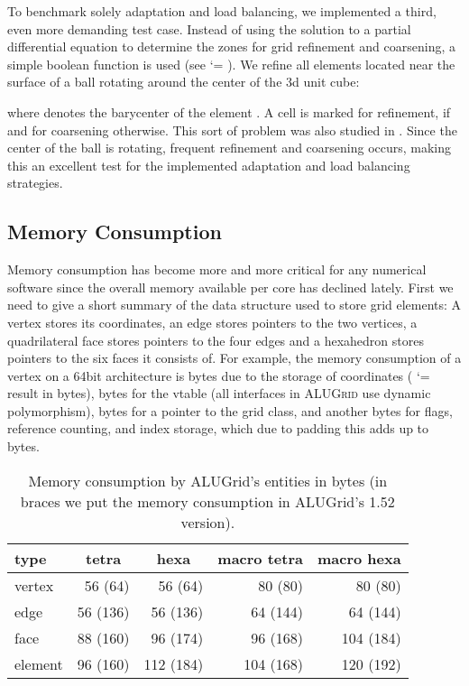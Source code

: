 \documentclass[10pt,notitlepage,a4paper]{article}
\makeatletter
\newcommand{\alugrid}{\textsc{ALUGrid}\xspace}
\newcommand{\code}[1]{ \lstinline[basicstyle=\small\sffamily]{#1} }
\newcommand{\file}[1]{\code{#1}}
\renewcommand\lstinline[1][]{\leavevmode\bgroup \def\lst@boxpos{b}\lsthk@PreSet\lstset{flexiblecolumns,#1}\lsthk@TextStyle
          \ifnum\iffalse{\fi`}=\z@\fi
          \@ifnextchar\bgroup{\ifnum`{=\z@}\fi \afterassignment\lst@InlineG \let\@let@token}{\ifnum`{=\z@}\fi\lstinline@}}
\newcommand{\tbl}[2]{\begin{center}\caption{#1}{#2}\end{center}}
\makeatother
\begin{document}
To benchmark solely adaptation and load balancing, we implemented a third, even
more demanding test case.
Instead of using the solution to a partial differential equation to determine
the zones for grid refinement and coarsening, a simple boolean function
 is used (see \file{examples/problem-ball.hh}).
We refine all elements located near the surface of a ball rotating around the
center of the 3d unit cube: 

where  denotes the barycenter of the element .
A cell  is marked for refinement, if  and for coarsening otherwise.
This sort of problem was also studied in \cite{schupp:phd}.
Since the center of the ball is rotating, frequent refinement and coarsening occurs,
making this an excellent test for the implemented adaptation and load balancing
strategies.

\subsection{Memory Consumption}
\label{sec:memory}
Memory consumption has become more and more critical for any numerical software 
since the overall memory available per core has declined lately. 
First we need to give a short summary of the data structure used to store
grid elements:
A vertex stores its coordinates, an edge stores pointers
to the two vertices, a quadrilateral face stores pointers to the four edges and a hexahedron stores
pointers to the six faces it consists of. For example, the memory consumption of a vertex on a
64bit architecture is  bytes due to the storage of coordinates ( \code{double} result in  bytes), 
 bytes for the vtable (all interfaces in \alugrid use dynamic polymorphism),
 bytes for a pointer to the grid class, 
and another  bytes for flags, reference counting, and index storage, which due to padding this adds up to
 bytes.

\begin{table}[ht]{}
\renewcommand{\arraystretch}{1.5}
\tbl{Memory consumption by ALUGrid's entities in bytes (in braces we put the memory
consumption in  ALUGrid's 1.52 version).}{\begin{tabular}{l|rr|rr}
  type         &   \multicolumn{1}{c}{tetra}  & \multicolumn{1}{c|}{ hexa} & \multicolumn{1}{c}{  macro tetra} & \multicolumn{1}{c}{ macro hexa} \\ \hline \hline 
  vertex       &   56 \phantom{5}(64)  &  56 \phantom{5}(64)  &   80 \phantom{5}(80)   &  80 \phantom{5}(80)  \\
  edge         &   56 (136) &  56  (136) &   64  (144)  &  64  (144) \\ 
  face         &   88 (160) &  96  (174) &   96  (168)  &  104 (184) \\ 
  element      &   96 (160) &  112 (184) &   104 (168)  &  120 (192) \\  
\end{tabular}}
\end{table}
\end{document}
